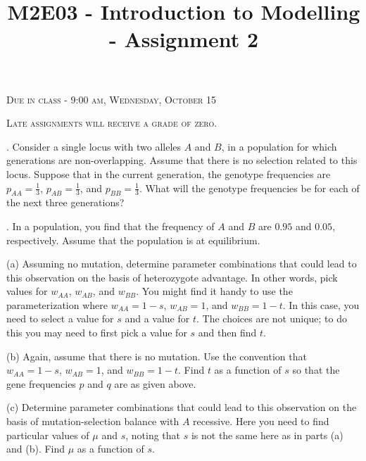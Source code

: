 \documentclass[reqno,12pt]{amsart}
\begin{document}
\title{M2E03 - Introduction to Modelling - Assignment 2}
\maketitle

\begin{center}
\pagestyle{myheadings} 
\thispagestyle{empty}

\bigskip

\textsc{Due in class - 9:00 am, Wednesday, October 15}

\bigskip

\textsc{Late assignments will receive a grade of zero.}

%

\bigskip
\bigskip
\end{center}

.  Consider a single locus with two alleles $A$ and $B$, in a
population for which generations are non-overlapping.  Assume
that there is no selection related to this locus.  Suppose
that in the current generation, the genotype frequencies are
$p_{AA} = \frac 13$, $p_{AB} = \frac 13$, and $p_{BB} = \frac 13$.
What will the genotype frequencies be for each of the next three
generations?


\bigskip

. In a population, you find that the frequency of $A$ and $B$ are
$0.95$ and $0.05$, respectively.  Assume that the population is at
equilibrium.

\noindent
(a)  Assuming no mutation, determine parameter combinations that
could lead to this observation on the basis of heterozygote
advantage.  In other words, pick values for $w_{AA}$, $w_{AB}$,
and $w_{BB}$.  You might find it handy to use the parameterization
where $w_{AA} = 1-s$, $w_{AB} = 1$, and $w_{BB} = 1-t$.  In this
case, you need to select a value for $s$ and a value for $t$.
The choices are not unique; to do this you may need to first
pick a value for $s$ and then find $t$.

\noindent
(b)  Again, assume that there is no mutation.  Use the convention
that $w_{AA} = 1-s$, $w_{AB} = 1$, and $w_{BB} = 1-t$.  Find $t$
as a function of $s$ so that the gene frequencies $p$ and $q$ are
as given above.

\noindent
(c)  Determine parameter combinations that could lead to this
observation on the basis of mutation-selection balance with
$A$ recessive.  Here you need to find particular values of
$\mu$ and $s$, noting that $s$ is not the same here as in
parts (a) and (b).  Find $\mu$ as a function of $s$.
\end{document}
